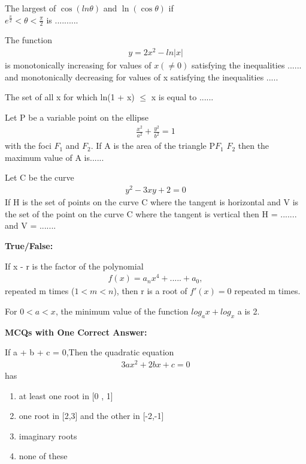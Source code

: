 \item The largest of $\cos(ln \theta)$ and $\ln(\cos \theta)$ if\\ $e^{\frac{\pi}{2}} < \theta < \frac{\pi}{2}$ is ..........

\item The function 
\begin{align*} 
y = 2x^2 - ln|x|
\end{align*}
is monotonically increasing for values of $x( \neq 0)$ satisfying the inequalities ...... and monotonically decreasing for values of x satisfying the inequalities .....

\item The set of all x for which ln(1 + x) $ \leq $ x is equal to ......

\item Let P be a variable point on the ellipse
\begin{align} 
\frac{x^2}{a^2} + \frac{y^2}{b^2} = 1
\end{align} 
with the foci $F_1$ and $F_2$. If A is the area of the triangle P$F_1$ $F_2$ then the maximum value of A is......

\item Let C be the curve 
\begin{align}
y^2 - 3xy + 2 = 0
\end{align}
If H is the set of points on the curve C where the tangent is horizontal and V is the set of the point on the curve C where the tangent is vertical then H = ....... and V = ....... 

\textbf{True/False:}

\item If x - r is the factor of the polynomial 
\begin{align*}
f(x)= a_nx^4 + .....+ a_0,
\end{align*} 
repeated m times ($1 < m < n$), then r is a root of $f'(x) = 0$ repeated m times.

\item For $0 < a < x$, the minimum value of the function $log_a x + log_x$ a is 2.

\textbf{MCQs with One Correct Answer:}

\item If a + b + c = 0,Then the quadratic equation 
\begin{align}
3ax^2 + 2bx + c = 0
\end{align} 
has 
\begin{enumerate}
\item at least one root in [0 , 1]
\item one root in [2,3] and the other in [-2,-1]
\item imaginary roots
\item none of these
\end{enumerate}

